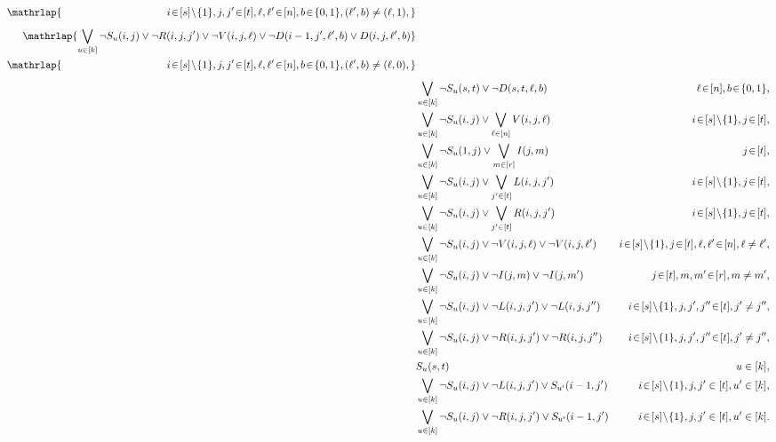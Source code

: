 \begin{alignat}{2}
\begin{split}
\mathrlap{  \, \, \, \, \, \, \, \; \; \; \quad \quad \qquad \qquad \qquad  i \! \in \! [s] \! \setminus \! \{1\}, j,j' \! \in \! [t], \ell,\ell' \! \in \! [n], b \! \in \! \{0,1\}, (\ell',b) \neq (\ell,1),} 
\end{split} \\[1ex]
\begin{split}
\label{rrefclause:res-R-transf} \mathrlap{ \bigvee_{u\in [k]} \neg S_u(i,j) \lor \neg R(i,j,j') \lor \neg V(i,j,\ell) \lor \neg D(i-1,j',\ell',b) \lor D(i,j,\ell',b)} \\
 \mathrlap{  \, \, \, \, \, \, \, \; \; \; \quad \quad \qquad \qquad \qquad  i \! \in \! [s] \! \setminus \! \{1\}, j,j' \! \in \! [t], \ell,\ell' \! \in \! [n], b \! \in \! \{0,1\}, (\ell',b) \neq (\ell,0),}
\end{split} \\[1ex]
\label{rrefclause:empty-clause} & \bigvee_{u \in [k]} \neg S_u(s,t) \lor \neg D(s,t,\ell,b) & \ell \! \in \! [n], b \! \in \! \{0,1\}, \\
\label{rrefclause:V-dom} & \bigvee_{u \in [k]} \neg S_u(i,j) \lor \bigvee_{\ell \in [n]} V(i,j,\ell) &  i \! \in \! [s] \! \setminus \! \{1\}, j\! \in \! [t], \\
\label{rrefclause:I-dom} & \bigvee_{u\in [k]} \neg S_u(1,j) \lor \bigvee_{m \in [r]} I(j,m) & j\! \in \! [t], \\
\label{rrefclause:L-dom} & \bigvee_{u\in [k]} \neg S_u(i,j) \lor \bigvee_{j' \in [t]} L(i,j,j')  &  i \! \in \! [s] \! \setminus \! \{1\}, j\! \in \! [t], \\
\label{rrefclause:R-dom} & \bigvee_{u\in [k]} \neg S_u(i,j) \lor \bigvee_{j' \in [t]} R(i,j,j')  &  i \! \in \! [s] \! \setminus \! \{1\}, j\! \in \! [t], \\
\label{rrefclause:V-func} & \bigvee_{u\in [k]} \neg S_u(i,j) \lor \neg V(i,j,\ell) \lor \neg V(i,j,\ell')  &   i \! \in \! [s] \! \setminus \! \{1\}, j\! \in \! [t], \ell,\ell' \! \in \! [n], \ell \neq \ell',\\
\label{rrefclause:I-func} & \bigvee_{u\in [k]} \neg S_u(i,j) \lor \neg I(j,m) \lor \neg I(j,m')  &  j\! \in \! [t], m,m' \! \in \! [r], m \neq m',\\
\label{rrefclause:L-func} & \bigvee_{u\in [k]} \neg S_u(i,j) \lor \neg L(i,j,j') \lor \neg L(i,j,j'')  &   i \! \in \! [s] \! \setminus \! \{1\}, j,j',j'' \! \in \! [t], j' \neq j'',\\
\label{rrefclause:R-func} & \bigvee_{u\in [k]} \neg S_u(i,j) \lor \neg R(i,j,j') \lor \neg R(i,j,j'')  &   i \! \in \! [s] \! \setminus \! \{1\}, j,j',j'' \! \in \! [t], j' \neq j'', \\
\label{rrefclause:Sst-true} & S_u(s,t) & u \in [k], \\
\label{rrefclause:L-unused-to-zero} & \bigvee_{u\in [k]} \neg S_u(i,j) \lor \neg L(i,j,j') \lor S_{u'}(i-1,j') & i \! \in \! [s] \! \setminus \! \{1\}, j,j' \in [t], u' \in [k], \\
\label{rrefclause:R-unused-to-zero} & \bigvee_{u\in [k]} \neg S_u(i,j) \lor \neg R(i,j,j') \lor S_{u'}(i-1,j') & i \! \in \! [s] \! \setminus \! \{1\}, j,j' \in [t], u' \in [k]. 
\end{alignat}
\endgroup

